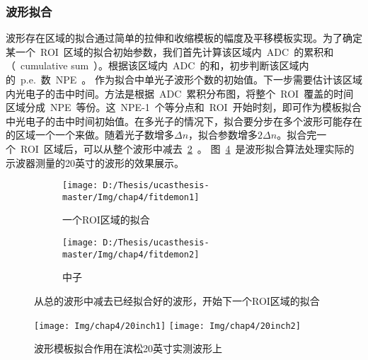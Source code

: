\subsubsection{波形拟合}
波形存在区域的拟合通过简单的拉伸和收缩模板的幅度及平移模板实现。为了确定某一个~ROI~区域的拟合初始参数，我们首先计算该区域内~ADC~的累积和（~cumulative sum~）。根据该区域内~ADC~的和，初步判断该区域内的~p.e.~数~NPE~。 作为拟合中单光子波形个数的初始值。下一步需要估计该区域内光电子的击中时间。方法是根据~ADC~累积分布图，将整个~ROI~覆盖的时间区域分成~NPE~等份。这~NPE-1~个等分点和~ROI~开始时刻，即可作为模板拟合中光电子的击中时间初始值。在多光子的情况下，拟合要分步在多个波形可能存在的区域一个一个来做。随着光子数增多$\Delta n$，拟合参数增多$2 \Delta n$。拟合完一个~ROI~区域后，可以从整个波形中减去~\ref{fig:fitdemo_2}~。
图~\ref{fig:20inch}~是波形拟合算法处理实际的示波器测量的20英寸的波形的效果展示。
\begin{figure}[!htbp]
  \centering
  \begin{subfigure}[b]{\MySubFactor\textwidth}
    \texttt{[image: D:/Thesis/ucasthesis-master/Img/chap4/fitdemon1]}
    \caption{一个ROI区域的拟合}
    \label{fig:fitdemo_1}
  \end{subfigure}%
  \quad\quad\quad\quad\quad\quad%
  \begin{subfigure}[b]{\MySubFactor\textwidth}
    \texttt{[image: D:/Thesis/ucasthesis-master/Img/chap4/fitdemon2]}
    \caption{中子}
    \label{fig:fitdemo_2}
  \end{subfigure}
    \caption{从总的波形中减去已经拟合好的波形，开始下一个ROI区域的拟合}
  \label{fig:模板拟合示意图}
\end{figure}

\begin{figure}[!htbp]
  \centering
   \texttt{[image: Img/chap4/20inch1]}
   \texttt{[image: Img/chap4/20inch2]}
    \caption{波形模板拟合作用在滨松20英寸实测波形上}
  \label{fig:20inch}
\end{figure}

